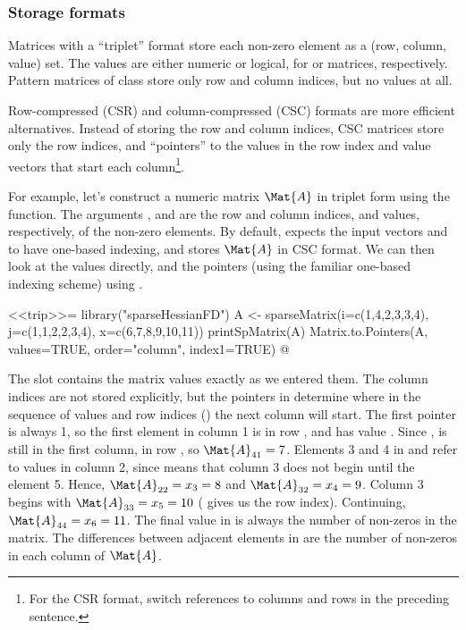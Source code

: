 \subsubsection[Storage formats]{Storage formats}

Matrices with a ``triplet'' format store each non-zero element as a
(row, column, value) set.  The values are either numeric or logical,
for  or  matrices, respectively.
Pattern matrices of class  store only row and column
indices, but no values at all.

Row-compressed (CSR) and column-compressed (CSC) formats are more
efficient alternatives.  Instead of storing the row and column indices, CSC
matrices store only the row indices, and ``pointers''
to the values in the row index and value vectors that start
each column\footnote{For the CSR format, switch references to columns and rows
in the preceding sentence.}.

For example, let's construct a numeric matrix $\Mat{A}$ in triplet form using
the  function. The arguments ,
 and  are the row and column indices, and
values, respectively, of the non-zero elements.  By default,  expects the input vectors  and  to
have one-based indexing, and stores $\Mat{A}$ in CSC format.  We can then
look at the values directly, and the pointers (using the familiar
one-based indexing scheme) using .

<<trip>>=
library("sparseHessianFD")
A <- sparseMatrix(i=c(1,4,2,3,3,4), j=c(1,1,2,2,3,4), x=c(6,7,8,9,10,11))
printSpMatrix(A)
Matrix.to.Pointers(A, values=TRUE, order="column", index1=TRUE)
@


The slot  contains the matrix values exactly as we entered
them.  The column indices are not stored explicitly, but the pointers in 
determine where in the sequence of values and row indices () the next
column will start. The first pointer is always 1, so the first element in column 1 is in
 row , and has value .  Since ,  is still in
the first column, in row , so $\Mat{A}_{41}=7$.  Elements 3 and 4 in
 and  refer to values in column 2, since
 means that column 3 does not begin until the element
5. Hence, $\Mat{A}_{22}=x_3=8$ and $\Mat{A}_{32}=x_4=9$.
Column 3 begins with $\Mat{A}_{33}=x_5=10$ ( gives us the
row index).  Continuing,
$\Mat{A}_{44}=x_6=11$.  The final value in
 is always the number of non-zeros in the matrix.  The differences between
adjacent elements in  are the number of non-zeros in each column of $\Mat{A}$.

